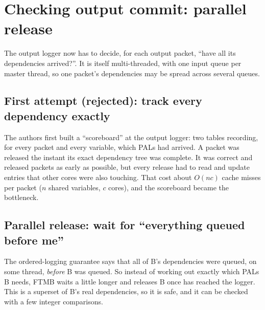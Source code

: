 \section{Checking output commit: parallel release}\label{sec:ftmbrelease}

The output logger now has to decide, for each output packet, ``have all its dependencies arrived?''. It is itself
multi-threaded, with one input queue per master thread, so one packet's dependencies may be spread across several queues.

\subsection{First attempt (rejected): track every dependency exactly}
The authors first built a ``scoreboard'' at the output logger: two tables recording, for every packet and every variable, which
PALs had arrived. A packet was released the instant its exact dependency tree was complete. It was correct and released packets as
early as possible, but every release had to read and update entries that other cores were also touching. That cost about $O(nc)$
cache misses per packet ($n$ shared variables, $c$ cores), and the scoreboard became the bottleneck.

\subsection{Parallel release: wait for ``everything queued before me''}
The ordered-logging guarantee says that all of B's dependencies were queued, on some thread, \emph{before} B was queued. So instead of
working out exactly which PALs B needs, FTMB waits a little longer and releases B once 
has reached the logger. This is a superset of B's real dependencies, so it is safe, and it can be checked with a few integer
comparisons.


